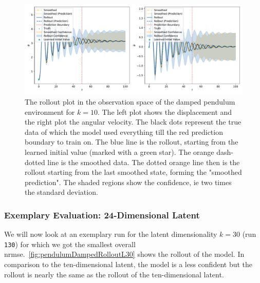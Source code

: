 			\begin{figure}
				\centering
				\includegraphics[width=\linewidth]{figures/results/pendulum-damped/run-latent-dim-10/rollout-observations-N0.pdf}
				\caption{The rollout plot in the observation space of the damped pendulum environment for \(k = 10\). The left plot shows the displacement and the right plot the angular velocity. The black dots represent the true data of which the model used everything till the red prediction boundary to train on. The blue line is the rollout, starting from the learned initial value (marked with a green star). The orange dash-dotted line is the smoothed data. The dotted orange line then is the rollout starting from the last smoothed state, forming the "smoothed prediction". The shaded regions show the confidence, \ac{ie} two times the standard deviation.}
				\label{fig:pendulumDampedRolloutL10}
			\end{figure}

		\subsubsection{Exemplary Evaluation: 24-Dimensional Latent}
			We will now look at an exemplary run for the latent dimensionality \( k = 30 \) (run \texttt{130}) for which we got the smallest overall \ac{nrmse}.~\autoref{fig:pendulumDampedRolloutL30} shows the rollout of the model. In comparison to the ten-dimensional latent, the model is a less confident but the rollout is nearly the same as the rollout of the ten-dimensional latent.

